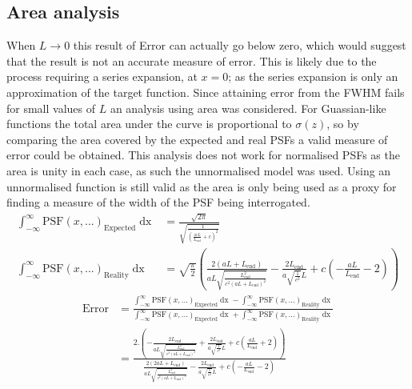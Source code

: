 \subsection{Area analysis}
When $L\to0$ this result of Error can actually go below zero, which would suggest that the result is not an accurate measure of error.
This is likely due to the process requiring a series expansion, at $x=0$; as the series expansion is only an approximation of the target function.
Since attaining error from the FWHM fails for small values of $L$ an analysis using area was considered.
For Guassian-like functions the total area under the curve is proportional to $\sigma(z)$, so by comparing the area covered by the expected and real PSFs a valid measure of error could be obtained.
This analysis does not work for normalised PSFs as the area is unity in each case, as such the unnormalised model was used.
Using an unnormalised function is still valid as the area is only being used as a proxy for finding a measure of the width of the PSF being interrogated.
\begin{align*}
  \int_{-\infty}^{\infty} \text{PSF}(x,...)_{\text{Expected}} \mathop{dx} &= \frac{\sqrt{2 \pi }}{\sqrt{\frac{1}{\left(\frac{a c L}{L_{\text{end}}}+c\right)^2}}}\\
  \int_{-\infty}^{\infty} \text{PSF}(x,...)_{\text{Reality}} \mathop{dx} &=\sqrt{\frac{\pi }{2}} \left(\frac{2 (a L+L_{\text{end}})}{a L \sqrt{\frac{L_{\text{end}}^2}{c^2 (a L+L_{\text{end}})^2}}}-\frac{2 L_{\text{end}}}{a \sqrt{\frac{1}{c^2}} L}+c \left(-\frac{a L}{L_{\text{end}}}-2\right)\right)
\end{align*}
\begin{align*}
  \text{Error} &= \frac{\int_{-\infty}^{\infty} \text{PSF}(x,...)_{\text{Expected}} \mathop{dx} - \int_{-\infty}^{\infty} \text{PSF}(x,...)_{\text{Reality}}\mathop{dx}}
  {\int_{-\infty}^{\infty} \text{PSF}(x,...)_{\text{Expected}} \mathop{dx} + \int_{-\infty}^{\infty} \text{PSF}(x,...)_{\text{Reality}}\mathop{dx}} \\
  &= \frac{2. \left(-\frac{2 L_{\text{end}}}{a L \sqrt{\frac{L_{\text{end}}^2}{c^2 (a L+L_{\text{end}})^2}}}+\frac{2 L_{\text{end}}}{a \sqrt{\frac{1}{c^2}} L}+c \left(\frac{a L}{L_{\text{end}}}+2\right)\right)}{\frac{2 (2 a L+L_{\text{end}})}{a L \sqrt{\frac{L_{\text{end}}^2}{c^2 (a L+L_{\text{end}})^2}}}-\frac{2 L_{\text{end}}}{a \sqrt{\frac{1}{c^2}} L}+c \left(-\frac{a L}{L_{\text{end}}}-2\right)}
\end{align*}
